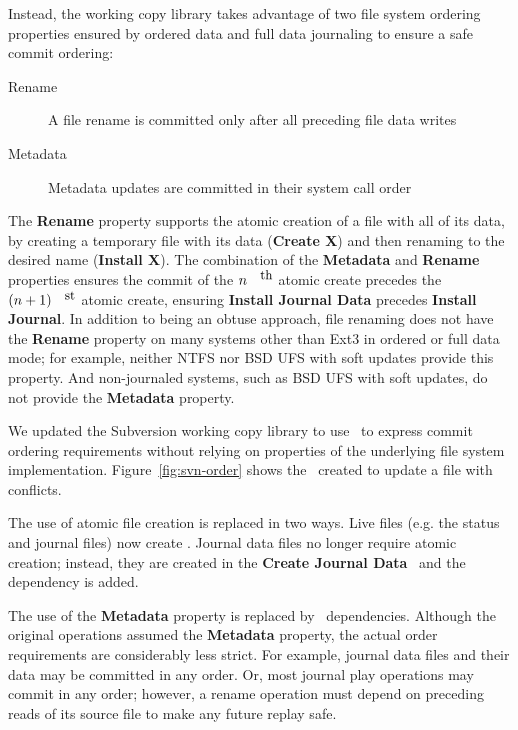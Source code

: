 Instead, the working copy library takes advantage of two file system
ordering properties ensured by ordered data and full data journaling
to ensure a safe commit ordering:
\begin{description}
\item[Rename] A file rename is committed only after all preceding file
  data writes
\item[Metadata] Metadata updates are committed in their system call order
\end{description}
%
The \textbf{Rename} property supports the atomic creation of a file
with all of its data, by creating a temporary file with its data
(\textbf{Create X}) and then renaming to the desired name
(\textbf{Install X}).
%
The combination of the \textbf{Metadata} and \textbf{Rename}
properties ensures the commit of the $n^{\mbox{\small{th}}}$ atomic
create precedes the \((n+1)^{\mbox{\small{st}}}\) atomic create,
ensuring \textbf{Install Journal Data} precedes \textbf{Install
  Journal}.
%
In addition to being an obtuse approach, file renaming does not have
the \textbf{Rename} property on many systems other than Ext3 in
ordered or full data mode; for example, neither NTFS nor BSD UFS with
soft updates provide this property.
%
And non-journaled systems, such as BSD UFS with soft updates, do not
provide the \textbf{Metadata} property.

We updated the Subversion working copy library to use \opgroups\ to
express commit ordering requirements without relying on properties of the
underlying file system implementation.
%
Figure~\ref{fig:svn-order} shows the \opgroups\ created to update a
file with conflicts.

The use of atomic file creation is replaced in two ways.
%
Live files (e.g. the status and journal files) now create
.
%
Journal data files no longer require atomic creation; instead, they
are created in the \textbf{Create Journal Data} \opgroup\ and the
dependency is added.

The use of the \textbf{Metadata} property is replaced by \opgroup\
dependencies.
%
Although the original operations assumed the \textbf{Metadata}
property, the actual order requirements are considerably less strict.
%
For example, journal data files and their data may be committed in any
order.
%
Or, most journal play operations may commit in any order; however, a
rename operation must depend on preceding reads of its source file to
make any future replay safe.

